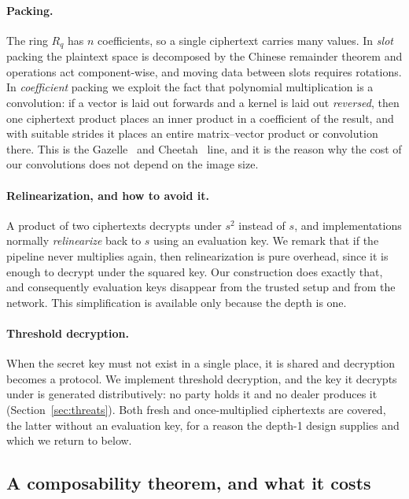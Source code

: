 \documentclass[11pt]{article}
\begin{document}
\paragraph{Packing.} The ring $R_q$ has $n$ coefficients, so a single ciphertext carries many
values. In \emph{slot} packing the plaintext space is decomposed by the Chinese remainder
theorem and operations act component-wise, and moving data between slots requires rotations.
In \emph{coefficient} packing we exploit the fact that polynomial multiplication is a
convolution: if a vector is laid out forwards and a kernel is laid out \emph{reversed}, then
one ciphertext product places an inner product in a coefficient of the result, and with
suitable strides it places an entire matrix--vector product or convolution there. This is the
Gazelle~\cite{Gazelle} and Cheetah~\cite{Cheetah} line, and it is the reason why the cost of
our convolutions does not depend on the image size.

\paragraph{Relinearization, and how to avoid it.} A product of two ciphertexts decrypts under
$s^2$ instead of $s$, and implementations normally \emph{relinearize} back to $s$ using an
evaluation key. We remark that if the pipeline never multiplies again, then relinearization is
pure overhead, since it is enough to decrypt under the squared key. Our construction does
exactly that, and consequently evaluation keys disappear from the trusted setup and from the
network. This simplification is available only because the depth is one.

\paragraph{Threshold decryption.} When the secret key must not exist in a single place, it is
shared and decryption becomes a protocol. We implement threshold decryption, and the key it
decrypts under is generated distributively: no party holds it and no dealer produces it
(Section~\ref{sec:threats}). Both fresh and once-multiplied ciphertexts are covered, the latter
without an evaluation key, for a reason the depth-1 design supplies and which we return to
below.


\subsection{A composability theorem, and what it costs}
\label{sec:uc}
\end{document}
